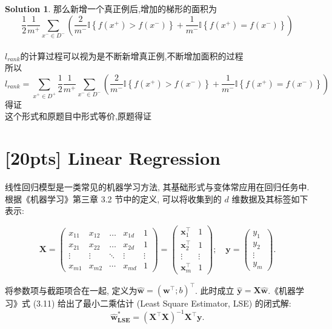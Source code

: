 \documentclass[a4paper,UTF8]{article}
\numberwithin{equation}{section}
\theoremstyle{definition}
\newtheorem*{solution}{Solution}
\def \X {\mathbf{X}}
\def \w {\hat{\boldsymbol{w}}}
\def \y {\mathbf{y}}
\def \x {\mathbf{x}}
\begin{document}
\begin{solution}
	那么新增一个真正例后,增加的梯形的面积为$$\frac{1}{2} \frac{1}{m^+} \sum_{x^-\in D^-}\left(\frac{2}{m^-}\mathbb{I}\left\{f(x^+) > f(x^-)\right\}+\frac{1}{m^-}\mathbb{I}\left\{f(x^+)=f(x^-)\right\}\right)$$\\
	$l_{rank}$的计算过程可以视为是不断新增真正例,不断增加面积的过程\\
	所以$$l_{rank}=\sum_{x^+\in D^+} \frac{1}{2} \frac{1}{m^+} \sum_{x^-\in D^-}\left(\frac{2}{m^-}\mathbb{I}\left\{f(x^+) > f(x^-)\right\}+\frac{1}{m^-}\mathbb{I}\left\{f(x^+)=f(x^-)\right\}\right)$$得证\\
	这个形式和原题目中形式等价,原题得证
\end{solution}
\newpage




\section{[20pts] Linear Regression}
 线性回归模型是一类常见的机器学习方法, 其基础形式与变体常应用在回归任务中. 根据《机器学习》第三章 3.2 节中的定义, 可以将收集到的 $d$ 维数据及其标签如下表示: 

\[
\X=\left(\begin{array}{ccccc}
x_{11} & x_{12} & \ldots & x_{1 d} & 1 \\
x_{21} & x_{22} & \ldots & x_{2 d} & 1 \\
\vdots & \vdots & \ddots & \vdots & \vdots \\
x_{m 1} & x_{m 2} & \cdots & x_{m d} & 1
\end{array}\right)
=
\left(\begin{array}{cc}
\x_1^{\top} & 1 \\
\x_2^{\top} & 1 \\
\vdots & \vdots \\
\x_m^{\top} & 1
\end{array}\right)
;\quad \y 
=
\left(\begin{array}{c}
y_1\\
y_2\\
\vdots\\
y_m
\end{array}\right).
\]

将参数项与截距项合在一起, 定义为$\w=
\left(
\boldsymbol{w}^\top; b\right)^\top$. 此时成立 $\hat{\y} = \X\w$.《机器学习》式 (3.11) 给出了最小二乘估计 (Least Square Estimator, LSE) 的闭式解: 
\begin{equation}
    \label{eq:LSE}
    \w_{\textbf{LSE}}^* = \left(\X^\top\X\right)^{-1}\X^\top\y.
\end{equation}
  
\end{document}
